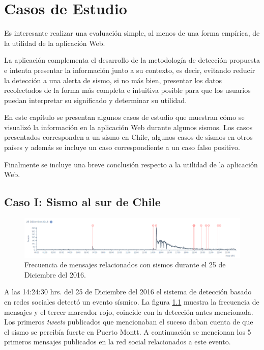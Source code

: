 \chapter{Casos de Estudio}
\label{cap:casos}

Es interesante realizar una evaluación simple, al menos de una forma empírica, de la utilidad de la aplicación Web. 

La aplicación complementa el desarrollo de la metodología de detección propuesta e intenta presentar la información junto a su contexto, es decir, evitando reducir la detección a una alerta de sismo, si no más bien, presentar los datos recolectados de la forma más completa e intuitiva posible para que los usuarios puedan interpretar su significado y determinar su utilidad.

En este capítulo se presentan algunos casos de estudio que muestran cómo se visualizó la información en la aplicación Web durante algunos sismos. 
Los casos presentados corresponden a un sismo en Chile, algunos casos de sismos en otros países y además se incluye un caso correspondiente a un caso falso positivo.

Finalmente se incluye una breve conclusión respecto a la utilidad de la aplicación Web.

	\section{Caso I: Sismo al sur de Chile}	
	
	\begin{figure}[!h]
	  \centering
	  \includegraphics[width=\textwidth]{imagenes/img-25Dic-freq.png}
	  \caption{Frecuencia de mensajes relacionados con sismos durante el 25 de Diciembre del 2016.}
		\label{fig:timeline-25Dic}
	\end{figure}
	
	
	A las 14:24:30 hrs. del 25 de Diciembre del 2016 el sistema de detección basado en redes sociales detectó  un evento sísmico. La figura \ref{fig:timeline-25Dic} muestra la frecuencia de mensajes y el tercer marcador rojo, coincide con la detección antes mencionada. Los primeros \textit{tweets} publicados que mencionaban el suceso daban cuenta de que el sismo se percibía fuerte en Puerto Montt. A continuación se mencionan los 5 primeros mensajes publicados en la red social relacionados a este evento. 


